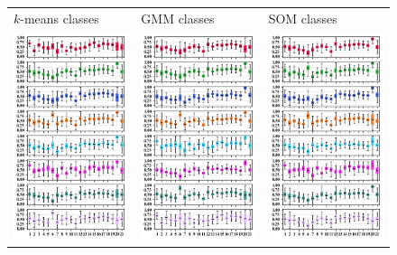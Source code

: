 \documentclass[border=0pt,varwidth=18cm,convert={outext=.jpg,density=300}]{standalone}%
\begin{document}
\pagecolor{white}%
\begin{figure}[h!]\centering
	\begin{tabular}{CCC}
		$k$-means classes & GMM classes & SOM classes \\
		\includegraphics[width=5.5cm]{Amaya/classesdatarange-kmeans} &
		\includegraphics[width=5.5cm]{Amaya/classesdatarange-gmm} &
		\includegraphics[width=5.5cm]{Amaya/classesdatarange-som} \hfill \\
	\end{tabular}
\end{figure}
\end{document}
